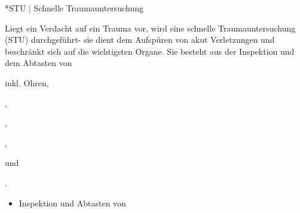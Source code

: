 \documentclass[
ngerman,
paper=a4,
asymmetric,
fontsize=10pt,
headings=small,
draft=false,
numbers=noenddot,
bibtotocnumbered,
footnotes=multiple,
]{scrreprt}
\begin{document}
\TextSlide
{*STU | Schnelle Traumauntersuchung}
{
Liegt ein Verdacht auf ein Trauma
vor, wird eine schnelle Traumauntersuchung (STU)
durchgeführt- sie dient dem Aufspüren von akut
 Verletzungen und beschränkt sich auf
die wichtigsten Organe. Sie besteht aus der  Inspektion
  und dem Abtasten von
  \begin{compactenum}
    \item {} inkl. Ohren,
    \item {},
    \item {},
    \item {},
    \item {} und
    \item {}.
  \end{compactenum}
}
{\begin{itemize}
  \item Inspektion
  und Abtasten von
\end{itemize}}
{}
{}
{}
\end{document}
